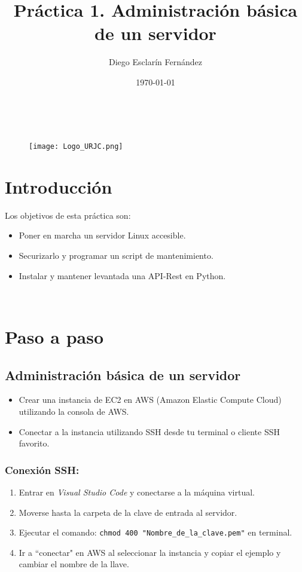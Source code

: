 \documentclass{article}
\title{\Huge \textbf{Práctica 1. Administración básica de un
servidor}}
\author{Diego Esclarín Fernández}
\date{\today}
\begin{document}
\begin{titlepage}
    \maketitle
    \ 
    \begin{figure}[h]
        \centering
        \texttt{[image: Logo\_URJC.png]}
        \label{fig:ejemplo}
    \end{figure}
\end{titlepage}


\section{Introducción}
Los objetivos de esta práctica son:
\begin{itemize}
  \item Poner en marcha un servidor Linux accesible.
  \item Securizarlo y programar un script de mantenimiento.
  \item Instalar y mantener levantada una API-Rest en Python.
\end{itemize}

\



\section{Paso a paso}
\subsection{Administración básica de un servidor}
\begin{itemize}
  \item Crear una instancia de EC2 en AWS (Amazon Elastic Compute Cloud) utilizando la consola de AWS.
  \item Conectar a la instancia utilizando SSH desde tu terminal o cliente SSH favorito.
\end{itemize}

\subsubsection{Conexión SSH:}
\begin{enumerate}
  \item Entrar en \textit{Visual Studio Code} y conectarse a la máquina virtual.
  \item Moverse hasta la carpeta de la clave de entrada al servidor.
  \item Ejecutar el comando: \texttt{chmod 400 "Nombre\_de\_la\_clave.pem"} en terminal.
  \item Ir a ``conectar" en AWS al seleccionar la instancia y copiar el ejemplo y cambiar el nombre de la llave.
\end{enumerate}
\end{document}
